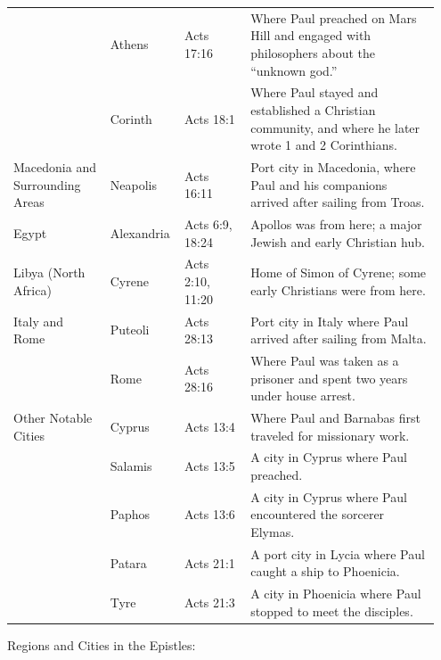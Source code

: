 \begin{longtable}[]{@{}p{0.22\linewidth} p{0.15\linewidth} p{0.15\linewidth} p{0.43\linewidth}@{}}
 & Athens & Acts 17:16 & Where Paul preached on Mars Hill and engaged with philosophers about the ``unknown god.'' \\
 & Corinth & Acts 18:1 & Where Paul stayed and established a Christian community, and where he later wrote 1 and 2 Corinthians. \\
\midrule
Macedonia and Surrounding Areas & Neapolis & Acts 16:11 & Port city in Macedonia, where Paul and his companions arrived after sailing from Troas. \\
\midrule
Egypt & Alexandria & Acts 6:9, 18:24 & Apollos was from here; a major Jewish and early Christian hub. \\
\midrule
Libya (North Africa) & Cyrene & Acts 2:10, 11:20 & Home of Simon of Cyrene; some early Christians were from here. \\
\midrule
Italy and Rome & Puteoli & Acts 28:13 & Port city in Italy where Paul arrived after sailing from Malta. \\
 & Rome & Acts 28:16 & Where Paul was taken as a prisoner and spent two years under house arrest. \\
\midrule
Other Notable Cities & Cyprus & Acts 13:4 & Where Paul and Barnabas first traveled for missionary work. \\
 & Salamis & Acts 13:5 & A city in Cyprus where Paul preached. \\
 & Paphos & Acts 13:6 & A city in Cyprus where Paul encountered the sorcerer Elymas. \\
 & Patara & Acts 21:1 & A port city in Lycia where Paul caught a ship to Phoenicia. \\
 & Tyre & Acts 21:3 & A city in Phoenicia where Paul stopped to meet the disciples. \\
\bottomrule
\end{longtable}

Regions and Cities in the Epistles:

